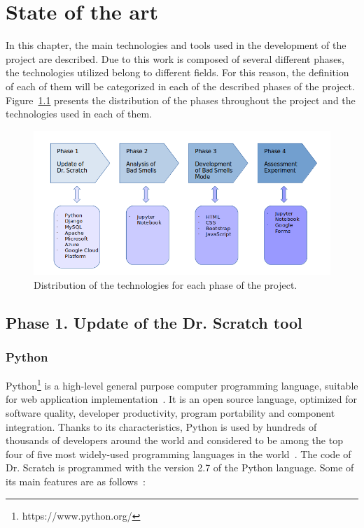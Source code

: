 

\chapter{State of the art}
\label{chap:state}

In this chapter, the main technologies and tools used in the development of the project are described. Due to this work is composed of several different phases, the technologies utilized belong to different fields. For this reason, the definition of each of them will be categorized in each of the described phases of the project. Figure~\ref{fig:phasesdistribution} presents the distribution of the phases throughout the project and the technologies used in each of them. 

 \begin{figure}
    \centering
    \includegraphics[width=15cm,keepaspectratio]{img/phases_state_art.png}
    \caption{Distribution of the technologies for each phase of the project.}
    \label{fig:phasesdistribution}
\end{figure}

\section{Phase 1. Update of the Dr. Scratch tool}
\label{sec:phase_1}

\subsection{Python} 
\label{subsec:python}

Python\footnote{https://www.python.org/} is a high-level general purpose computer programming language, suitable for web application implementation~\cite{kuhlman:python}. It is an open source language, optimized for software quality, developer productivity, program portability and component integration. Thanks to its characteristics, Python is used by hundreds of thousands of developers around the world and considered to be among the top four of five most widely-used programming languages in the world~\cite{lutz:programming}. The code of Dr. Scratch is programmed with the version 2.7 of the Python language. Some of its main features are as follows~\cite{javatpoint:_python}:

